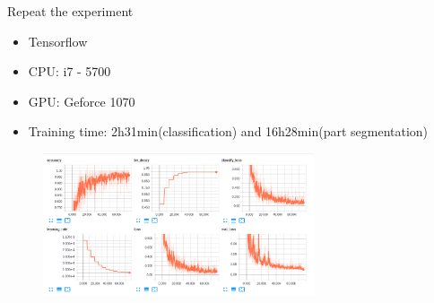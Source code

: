 \documentclass[serif,mathserif]{beamer}
\begin{document}
\begin{frame}{Repeat the experiment}
	\begin{itemize}
		\item Tensorflow
		\item CPU: i7 - 5700
		\item GPU: Geforce 1070
		\item Training time: 2h31min(classification) and 16h28min(part segmentation)
	\end{itemize}
	\begin{figure}
		\includegraphics[width=8cm]{image/classify_log.png}
	\end{figure}
\end{frame}
\end{document}

